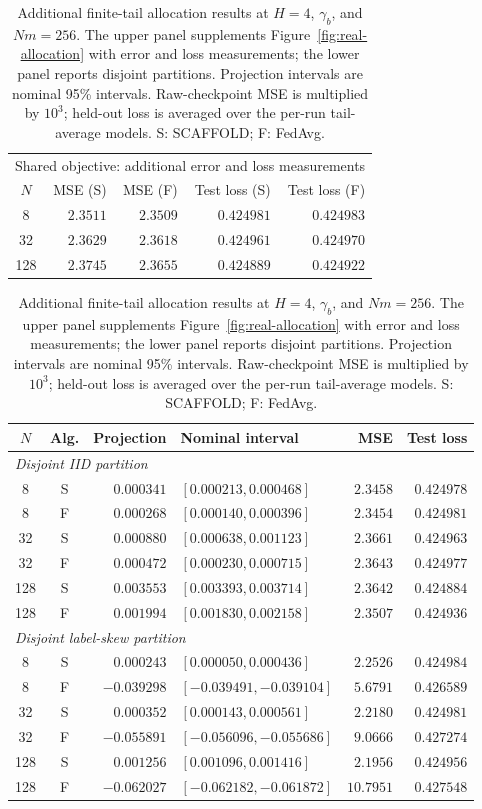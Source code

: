 \begin{table}[tbp]
\centering\small
\caption{Additional finite-tail allocation results at $H=4$, $\gamma_b$,
and $Nm=256$. The upper panel supplements Figure~\ref{fig:real-allocation}
with error and loss measurements; the lower panel reports disjoint
partitions. Projection intervals are nominal 95\% intervals.
Raw-checkpoint MSE is multiplied by $10^3$; held-out loss is averaged
over the per-run tail-average models. S: SCAFFOLD; F: FedAvg.}
\label{tab:supp-real-full}
\begin{tabular}{@{}crrrr@{}}
\toprule
\multicolumn{5}{c}{Shared objective: additional error and loss measurements} \\
$N$ & MSE (S) & MSE (F) & Test loss (S) & Test loss (F) \\
\midrule
8 & $2.3511$ & $2.3509$ & $0.424981$ & $0.424983$ \\
32 & $2.3629$ & $2.3618$ & $0.424961$ & $0.424970$ \\
128 & $2.3745$ & $2.3655$ & $0.424889$ & $0.424922$ \\
\bottomrule
\end{tabular}

\medskip
\begin{tabular}{@{}ccrlrr@{}}
\toprule
$N$ & Alg. & Projection & Nominal interval & MSE & Test loss \\
\midrule
\multicolumn{6}{l}{\emph{Disjoint IID partition}} \\
8 & S & $0.000341$ & $[0.000213,0.000468]$ & $2.3458$ & $0.424978$ \\
8 & F & $0.000268$ & $[0.000140,0.000396]$ & $2.3454$ & $0.424981$ \\
32 & S & $0.000880$ & $[0.000638,0.001123]$ & $2.3661$ & $0.424963$ \\
32 & F & $0.000472$ & $[0.000230,0.000715]$ & $2.3643$ & $0.424977$ \\
128 & S & $0.003553$ & $[0.003393,0.003714]$ & $2.3642$ & $0.424884$ \\
128 & F & $0.001994$ & $[0.001830,0.002158]$ & $2.3507$ & $0.424936$ \\
\midrule
\multicolumn{6}{l}{\emph{Disjoint label-skew partition}} \\
8 & S & $0.000243$ & $[0.000050,0.000436]$ & $2.2526$ & $0.424984$ \\
8 & F & $-0.039298$ & $[-0.039491,-0.039104]$ & $5.6791$ & $0.426589$ \\
32 & S & $0.000352$ & $[0.000143,0.000561]$ & $2.2180$ & $0.424981$ \\
32 & F & $-0.055891$ & $[-0.056096,-0.055686]$ & $9.0666$ & $0.427274$ \\
128 & S & $0.001256$ & $[0.001096,0.001416]$ & $2.1956$ & $0.424956$ \\
128 & F & $-0.062027$ & $[-0.062182,-0.061872]$ & $10.7951$ & $0.427548$ \\
\bottomrule
\end{tabular}
\end{table}

